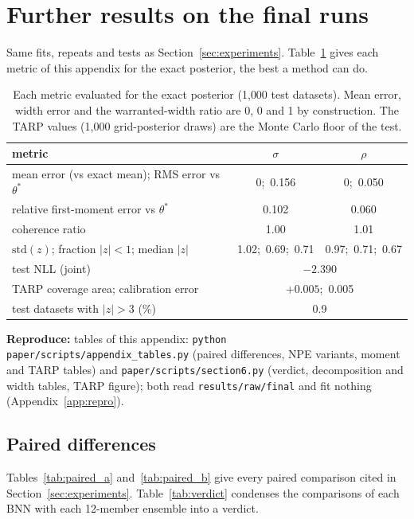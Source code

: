 \documentclass[11pt]{article}
\newcommand{\code}[1]{\texttt{#1}}
\newcommand{\repro}[1]{\par{\raggedright\color{gray}\footnotesize\textbf{Reproduce:} #1\par}}
\begin{document}



\clearpage
\appendix
\section{Further results on the final runs}
\label{app:final}
Same fits, repeats and tests as Section~\ref{sec:experiments}. Table~\ref{tab:exactfloor} gives each metric of this
appendix for the exact posterior, the best a method can do.

\begin{table}[h]
\centering\small
\begin{tabular}{lcc}
\toprule
metric & $\sigma$ & $\rho$ \\
\midrule
mean error (vs exact mean); RMS error vs $\theta^\ast$ & 0;\ 0.156 & 0;\ 0.050 \\
relative first-moment error vs $\theta^\ast$ & 0.102 & 0.060 \\
coherence ratio & 1.00 & 1.01 \\
$\mathrm{std}(z)$; fraction $|z|<1$; median $|z|$ & 1.02;\ 0.69;\ 0.71 & 0.97;\ 0.71;\ 0.67 \\
\midrule
test NLL (joint) & \multicolumn{2}{c}{$-2.390$} \\
TARP coverage area; calibration error & \multicolumn{2}{c}{$+0.005$;\ 0.005} \\
test datasets with $|z|>3$ (\%) & \multicolumn{2}{c}{0.9} \\
\bottomrule
\end{tabular}
\caption{Each metric evaluated for the exact posterior (1{,}000 test datasets). Mean error, width error and the
warranted-width ratio are 0, 0 and 1 by construction. The TARP values (1{,}000 grid-posterior draws) are the Monte Carlo floor of
the test.}
\label{tab:exactfloor}
\end{table}
\repro{tables of this appendix: \code{python paper/scripts/appendix\_tables.py} (paired
differences, NPE variants, moment and TARP tables) and \code{paper/scripts/section6.py} (verdict, decomposition and width
tables, TARP figure); both read \code{results/raw/final} and fit nothing (Appendix~\ref{app:repro}).}

\subsection{Paired differences}
\label{app:paired}
Tables~\ref{tab:paired_a} and~\ref{tab:paired_b} give every paired comparison cited in Section~\ref{sec:experiments}.
Table~\ref{tab:verdict} condenses the comparisons of each BNN with each 12-member ensemble into a verdict.
\end{document}
